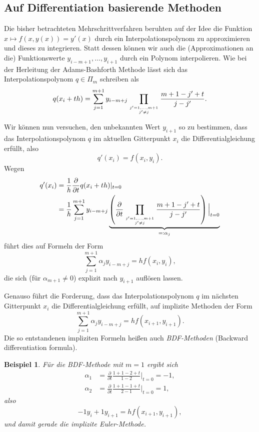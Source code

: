 \documentclass[
]{mycourse}
\theoremstyle{mythm}
\newtheorem{beispiel}[theorem]{Beispiel}
\theoremstyle{break}
\begin{document}
\subsection{Auf Differentiation basierende Methoden}

Die bisher betrachteten Mehrschrittverfahren beruhten auf der Idee die Funktion $x\mapsto f(x,y(x))=y'(x)$
durch ein Interpolationspolynom zu approximieren und dieses zu integrieren. 
Statt dessen können wir auch die (Approximationen an die) Funktionswerte
$y_{i-m+1},\ldots,y_{i+1}$ durch ein Polynom interpolieren. 
Wie bei der Herleitung der Adams-Bashforth Methode lässt sich das Interpolationspolynom 
$q\in \Pi_m$
schreiben als
\[
q(x_i+th)=\sum_{j=1}^{m+1} y_{i-m+j} \prod_{j'=1,\ldots,m+1 \atop j'\neq j}
 \frac{m+1-j'+t}{j-j'}.
\]

Wir können nun versuchen, den unbekannten Wert $y_{i+1}$ so zu bestimmen, 
dass das Interpolationspolynom $q$ im aktuellen Gitterpunkt $x_i$ 
die Differentialgleichung erfüllt, also
\[
q'(x_i)=f(x_i,y_i).
\]
Wegen
\begin{align*}
q'(x_i)&=\frac{1}{h} \frac{\partial}{\partial t} q(x_i+th)|_{t=0}\\
&=\frac{1}{h} \sum_{j=1}^{m+1} y_{i-m+j} \underbrace{\left( \frac{\partial}{\partial t}  \prod_{j'=1,\ldots,m+1 \atop j'\neq j}
 \frac{m+1-j'+t}{j-j'}\right)\Big|_{t=0}}_{=:\alpha_j}
\end{align*}
führt dies auf Formeln der Form
\[
\sum_{j=1}^{m+1} \alpha_j  y_{i-m+j} = h f(x_i,y_i),
\]
die sich (für $\alpha_{m+1}\neq 0$) explizit nach $y_{i+1}$ auflösen lassen.

Genauso führt die Forderung, dass das Interpolationspolynom $q$ im nächsten Gitterpunkt $x_i$ 
die Differentialgleichung erfüllt, auf implizite Methoden der Form
\[
\sum_{j=1}^{m+1} \alpha_j  y_{i-m+j} = h f(x_{i+1},y_{i+1}).
\]
Die so entstandenen impliziten Formeln heißen auch \emph{BDF-Methoden} (Backward differentiation formula).

\begin{beispiel}
Für die BDF-Methode mit $m=1$ ergibt sich
\begin{align*}
\alpha_1 &=  \frac{\partial}{\partial t}  
 \frac{1+1-2+t}{1-2}\Big|_{t=0}=-1,\\
\alpha_2 &=\frac{\partial}{\partial t}  
 \frac{1+1-1+t}{2-1}\Big|_{t=0}=1,
\end{align*}
also 
\[
-1 y_i + 1y_{i+1} = hf(x_{i+1},y_{i+1}),
\]
und damit gerade die implizite Euler-Methode.
\end{beispiel}
\end{document}
